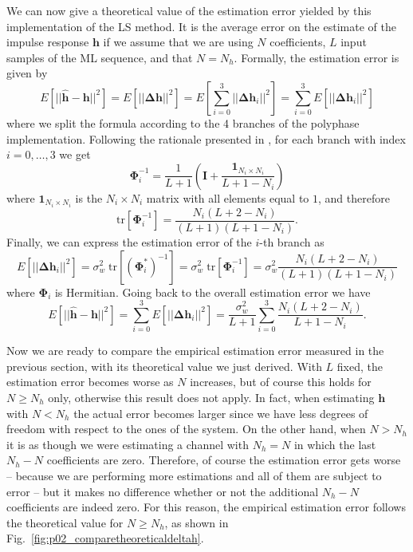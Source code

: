 \documentclass[10pt]{article}
\newcommand{\tr} {\mathrm{tr}}
\begin{document}
We can now give a theoretical value of the estimation error yielded by this implementation of the LS method. It is the average error on the estimate of the impulse response $\mathbf{h}$ if we assume that we are using $N$ coefficients, $L$ input samples of the ML sequence, and that $N=N_h$. Formally, the estimation error is given by
\begin{equation}
	E[||\mathbf{\hat{h}}-\mathbf{h}||^2] = E[||\mathbf{\Delta h}||^2] = E[\sum_{i=0}^{3} ||\mathbf{\Delta h}_i||^2] = \sum_{i=0}^{3} E[||\mathbf{\Delta h}_i||^2]
\end{equation}
where we split the formula according to the 4 branches of the polyphase implementation. Following the rationale presented in \cite{bc}, for each branch with index $i=0,\ldots,3$ we get
\begin{equation}
	\mathbf{\Phi}_i^{-1} = \frac{1}{L+1} \left( \mathbf{I} + \frac{\mathbf{1}_{N_i \times N_i}}{L+1-N_i} \right)
\end{equation}
where $\mathbf{1}_{N_i \times N_i}$ is the $N_i \times N_i$ matrix with all elements equal to $1$, and therefore
\begin{equation}
	\tr [\mathbf{\Phi}_i^{-1}] = \frac{N_i(L+2-N_i)}{(L+1)(L+1-N_i)}.
\end{equation}
Finally, we can express the estimation error of the $i$-th branch as
\begin{equation}
	E[||\mathbf{\Delta h}_i||^2] = \sigma_w^2 \; \tr [(\mathbf{\Phi}_i^*)^{-1}] = \sigma_w^2 \; \tr [\mathbf{\Phi}_i^{-1}] = \sigma_w^2 \frac{N_i(L+2-N_i)}{(L+1)(L+1-N_i)}
\end{equation}
where $\mathbf{\Phi}_i$ is Hermitian. Going back to the overall estimation error we have
\begin{equation}
	E[||\mathbf{\hat{h}}-\mathbf{h}||^2] = \sum_{i=0}^{3} E[||\mathbf{\Delta h}_i||^2] = \frac{\sigma_w^2}{L+1} \sum_{i=0}^{3} \frac{N_i (L+2-N_i)}{L+1-N_i}.
\end{equation}

Now we are ready to compare the empirical estimation error measured in the previous section, with its theoretical value we just derived. With $L$ fixed, the estimation error becomes worse as $N$ increases, but of course this holds for $N \geq N_h$ only, otherwise this result does not apply. In fact, when estimating $\mathbf{h}$ with $N<N_h$ the actual error becomes larger since we have less degrees of freedom with respect to the ones of the system. On the other hand, when $N > N_h$ it is as though we were estimating a channel with $N_h = N$ in which the last $N_h - N$ coefficients are zero. Therefore, of course the estimation error gets worse -- because we are performing more estimations and all of them are subject to error -- but it makes no difference whether or not the additional $N_h - N$ coefficients are indeed zero. For this reason, the empirical estimation error follows the theoretical value for $N \geq N_h$, as shown in Fig.~\ref{fig:p02_comparetheoreticaldeltah}.
\end{document}
